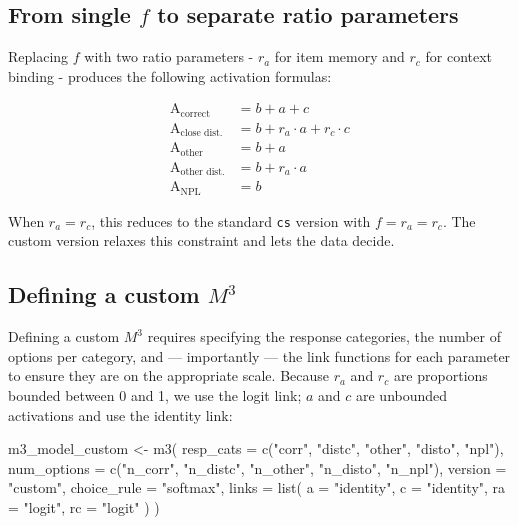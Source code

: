 \documentclass[
  man,
  floatsintext,
  longtable,
  nolmodern,
  notxfonts,
  notimes,
  colorlinks=true,linkcolor=blue,citecolor=blue,urlcolor=blue]{apa7}
\newenvironment{Shaded}{\begin{snugshade}}{\end{snugshade}}
\newcommand{\AttributeTok}[1]{\textcolor[rgb]{0.40,0.45,0.13}{#1}}
\newcommand{\FunctionTok}[1]{\textcolor[rgb]{0.28,0.35,0.67}{#1}}
\newcommand{\NormalTok}[1]{\textcolor[rgb]{0.00,0.23,0.31}{#1}}
\newcommand{\OtherTok}[1]{\textcolor[rgb]{0.00,0.23,0.31}{#1}}
\newcommand{\StringTok}[1]{\textcolor[rgb]{0.13,0.47,0.30}{#1}}
\begin{document}
\subsection{\texorpdfstring{From single \(f\) to separate ratio
parameters}{From single f to separate ratio parameters}}\label{from-single-f-to-separate-ratio-parameters}

Replacing \(f\) with two ratio parameters - \(r_a\) for item memory and
\(r_c\) for context binding - produces the following activation
formulas:

\[
\begin{aligned}
\text{A}_{\text{correct}}        &= b + a + c \\
\text{A}_{\text{close dist.}}    &= b + r_a \cdot a + r_c \cdot c \\
\text{A}_{\text{other}}          &= b + a \\
\text{A}_{\text{other dist.}}    &= b + r_a \cdot a \\
\text{A}_{\text{NPL}}            &= b
\end{aligned}
\]

When \(r_a = r_c\), this reduces to the standard \texttt{cs} version
with \(f = r_a = r_c\). The custom version relaxes this constraint and
lets the data decide.

\subsection{\texorpdfstring{Defining a custom
\(M^3\)}{Defining a custom M\^{}3}}\label{defining-a-custom-m3}

Defining a custom \(M^3\) requires specifying the response categories,
the number of options per category, and --- importantly --- the link
functions for each parameter to ensure they are on the appropriate
scale. Because \(r_a\) and \(r_c\) are proportions bounded between 0 and
1, we use the logit link; \(a\) and \(c\) are unbounded activations and
use the identity link:

\begin{Shaded}
\begin{Highlighting}[]
\NormalTok{m3\_model\_custom }\OtherTok{\textless{}{-}} \FunctionTok{m3}\NormalTok{(}
  \AttributeTok{resp\_cats   =} \FunctionTok{c}\NormalTok{(}\StringTok{"corr"}\NormalTok{, }\StringTok{"distc"}\NormalTok{, }\StringTok{"other"}\NormalTok{, }\StringTok{"disto"}\NormalTok{, }\StringTok{"npl"}\NormalTok{),}
  \AttributeTok{num\_options =} \FunctionTok{c}\NormalTok{(}\StringTok{"n\_corr"}\NormalTok{, }\StringTok{"n\_distc"}\NormalTok{, }\StringTok{"n\_other"}\NormalTok{, }\StringTok{"n\_disto"}\NormalTok{, }\StringTok{"n\_npl"}\NormalTok{),}
  \AttributeTok{version     =} \StringTok{"custom"}\NormalTok{,}
  \AttributeTok{choice\_rule =} \StringTok{"softmax"}\NormalTok{,}
  \AttributeTok{links =} \FunctionTok{list}\NormalTok{(}
    \AttributeTok{a  =} \StringTok{"identity"}\NormalTok{, }\AttributeTok{c  =} \StringTok{"identity"}\NormalTok{,}
    \AttributeTok{ra =} \StringTok{"logit"}\NormalTok{,    }\AttributeTok{rc =} \StringTok{"logit"}
\NormalTok{  )}
\NormalTok{)}
\end{Highlighting}
\end{Shaded}
\end{document}
